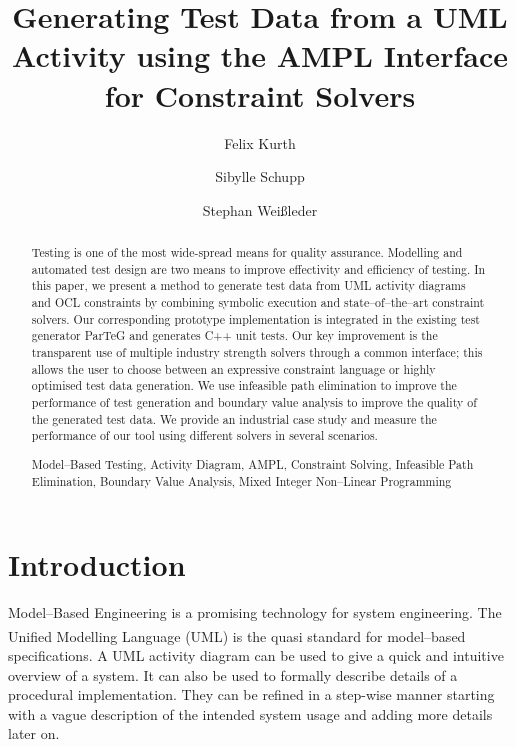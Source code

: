\documentclass[runningheads,a4paper]{llncs}%
\newcommand{\keywords}[1]{\par\addvspace\baselineskip%
\noindent\keywordname\enspace\ignorespaces#1}%
\begin{document}
%
%
\mainmatter

\title{Generating Test Data from a UML Activity using the AMPL Interface for Constraint Solvers}%

%
\author{Felix Kurth%
\and Sibylle Schupp%
\and Stephan Wei{\ss}leder%
}%

%

\maketitle%
%
\begin{abstract}%
Testing is one of the most wide-spread means for quality assurance. Modelling and
automated test design are two means to improve effectivity and efficiency of
testing. In this paper, we present a method to generate test data from UML
activity diagrams and OCL constraints by combining symbolic execution and
state--of--the--art constraint solvers. Our corresponding prototype
implementation is integrated in the existing test generator ParTeG and generates
C++ unit tests.
Our key improvement is the transparent use of multiple industry strength solvers
through a common interface; this allows the user to choose between an expressive
constraint language or highly optimised test data generation. We use infeasible
path elimination to improve the performance of test generation and boundary
value analysis to improve the quality of the generated test data. We provide an
industrial case study and measure the performance of our tool using different
solvers in several scenarios.
\keywords{Model--Based Testing, Activity Diagram, AMPL, Constraint Solving,
Infeasible Path Elimination, Boundary Value Analysis, Mixed Integer Non--Linear
Programming}%
\end{abstract}%
%
\section{Introduction}%
Model--Based Engineering is a promising technology for system engineering.
The Unified Modelling Language\textsuperscript{\texttrademark} (UML) is the
quasi standard for model--based specifications. A UML activity diagram can be
used to give a quick and intuitive overview of a system. It can also be used to
formally describe details of a procedural implementation. They can be refined in
a step-wise manner starting with a vague description of the intended system
usage and adding more details later on.
\end{document}
